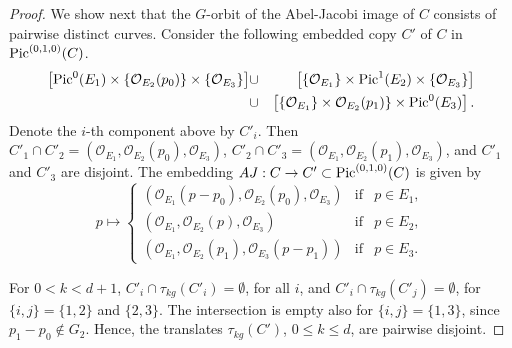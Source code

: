 \documentclass[12pt]{amsart}
\numberwithin{equation}{subsection}
\theoremstyle{plain}
\theoremstyle{definition}
\newcommand{\StructureSheaf}[1]{{\mathcal O}_{#1}}
\newcommand{\Pic}{{\rm Pic}}
\begin{document}
\begin{proof}
We show next that the $G$-orbit of the Abel-Jacobi image of $C$ consists of pairwise distinct curves.
Consider the following embedded copy $C'$ of $C$ in $\Pic^{(0,1,0)}(C)$.
\begin{eqnarray*}
\left[\Pic^0(E_1)\times\{\StructureSheaf{E_2}(p_0)\}\times\{\StructureSheaf{E_3}\}\right]
& \cup &
\left[
\{\StructureSheaf{E_1}\}\times\Pic^1(E_2)\times \{\StructureSheaf{E_3}\}\right]
\\
&\cup &
\left[
\{\StructureSheaf{E_1}\}\times\StructureSheaf{E_2}(p_1)\}\times \Pic^0(E_3)
\right].
\end{eqnarray*}
Denote the $i$-th component above by $C'_i$. 
Then $C'_1\cap C'_2=(\StructureSheaf{E_1},\StructureSheaf{E_2}(p_0),\StructureSheaf{E_3})$,
$C'_2\cap C'_3=(\StructureSheaf{E_1},\StructureSheaf{E_2}(p_1),\StructureSheaf{E_3})$,
and $C'_1$ and $C'_3$ are disjoint. The embedding $AJ:C\rightarrow C'\subset \Pic^{(0,1,0)}(C)$ is given by 
\begin{equation}
\label{eq-AJ}
p\mapsto\left\{
\begin{array}{ccl}
(\StructureSheaf{E_1}(p-p_0),\StructureSheaf{E_2}(p_0),\StructureSheaf{E_3}) & \mbox{if} & p\in E_1,
\\
(\StructureSheaf{E_1},\StructureSheaf{E_2}(p),\StructureSheaf{E_3}) & \mbox{if} & p\in E_2,
\\
(\StructureSheaf{E_1},\StructureSheaf{E_2}(p_1),\StructureSheaf{E_3}(p-p_1)) & \mbox{if} & p\in E_3.
\end{array}
\right.
\end{equation}



For $0<k<d+1$, $C'_i\cap\tau_{kg}(C'_i)=\emptyset$, for all $i$, and  $C'_i\cap\tau_{kg}(C'_j)=\emptyset$, for $\{i,j\}=\{1,2\}$ and $\{2,3\}$. The intersection is empty also for $\{i,j\}=\{1,3\}$, since $p_1-p_0\not\in G_2$. Hence, the translates $\tau_{kg}(C')$, $0\leq k \leq d$, are pairwise disjoint.


\end{proof}
\end{document}

